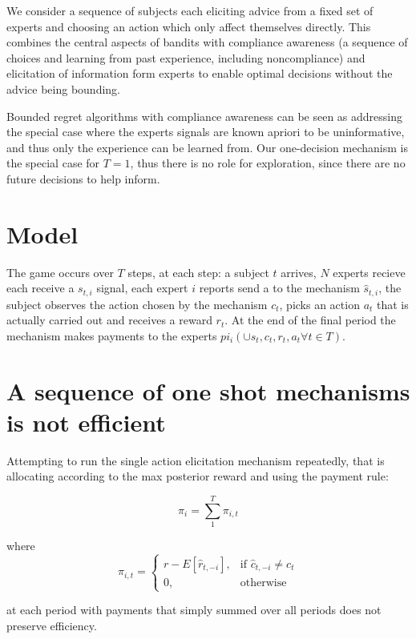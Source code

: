 

We consider a sequence of subjects each eliciting advice from a fixed set of experts and choosing an action which only affect themselves directly. This combines the central aspects of bandits with compliance awareness (a sequence of choices and learning from past experience, including noncompliance) and elicitation of information form experts to enable optimal decisions without the advice being bounding. 

Bounded regret algorithms with compliance awareness can be seen as addressing the special case where the experts signals are known apriori to be uninformative, and thus only the experience can be learned from. Our one-decision mechanism is the special case for $T={1}$, thus there is no role for exploration, since there are no future decisions  to help inform.
\section{Model}

The game occurs over $T$ steps, at each step: a subject $t$ arrives, $N$ experts recieve each receive a $s_{t,i}$ signal, each expert $i$ reports send a to the mechanism $\hat{s}_{t,i}$, the subject observes the action chosen by the mechanism $c_t$, picks an action $a_t$ that is actually carried out and receives a reward $r_t$.
At the end of the final period the mechanism makes payments to the experts $pi_i( \cup \hat{s}_t,c_t,r_t,a_t \forall t \in T)$.

\section{A sequence of one shot mechanisms is not efficient}

Attempting to run the single action elicitation mechanism repeatedly, that is allocating according to the max posterior reward and using the payment rule:

\[
    \pi_i = \sum_1^T \pi_{i,t} 
\]

where 
\[
    \pi_{i,t} =
\begin{cases}
    r - E[\hat{r}_{t,-i}] ,& \text{if } \hat{c}_{t,-i} \neq c_t\\
    0,              & \text{otherwise}
\end{cases}
\]

 at each period with payments that simply summed over all periods does not preserve efficiency.

